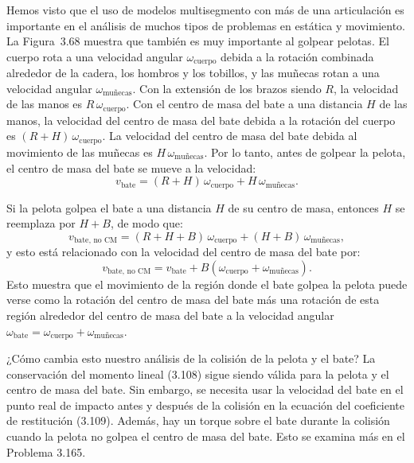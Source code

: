 \documentclass[12pt]{book}
\begin{document}
Hemos visto que el uso de modelos multisegmento con más de una articulación es importante en el análisis de muchos tipos de problemas en estática y movimiento. La Figura~3.68 muestra que también es muy importante al golpear pelotas. El cuerpo rota a una velocidad angular $\omega_{\text{cuerpo}}$ debida a la rotación combinada alrededor de la cadera, los hombros y los tobillos, y las muñecas rotan a una velocidad angular $\omega_{\text{muñecas}}$. Con la extensión de los brazos siendo $R$, la velocidad de las manos es $R\,\omega_{\text{cuerpo}}$. Con el centro de masa del bate a una distancia $H$ de las manos, la velocidad del centro de masa del bate debida a la rotación del cuerpo es $(R + H)\,\omega_{\text{cuerpo}}$. La velocidad del centro de masa del bate debida al movimiento de las muñecas es $H\,\omega_{\text{muñecas}}$. Por lo tanto, antes de golpear la pelota, el centro de masa del bate se mueve a la velocidad:
\begin{equation}
v_{\text{bate}} = (R + H)\,\omega_{\text{cuerpo}} + H\,\omega_{\text{muñecas}}.
\label{eq:3.131}
\end{equation}

Si la pelota golpea el bate a una distancia $H$ de su centro de masa, entonces $H$ se reemplaza por $H + B$, de modo que:
\begin{equation}
v_{\text{bate, no CM}} = (R + H + B)\,\omega_{\text{cuerpo}} + (H + B)\,\omega_{\text{muñecas}},
\label{eq:3.132}
\end{equation}
y esto está relacionado con la velocidad del centro de masa del bate por:
\begin{equation}
v_{\text{bate, no CM}} = v_{\text{bate}} + B(\omega_{\text{cuerpo}} + \omega_{\text{muñecas}}).
\label{eq:3.133}
\end{equation}
Esto muestra que el movimiento de la región donde el bate golpea la pelota puede verse como la rotación del centro de masa del bate más una rotación de esta región alrededor del centro de masa del bate a la velocidad angular $\omega_{\text{bate}} = \omega_{\text{cuerpo}} + \omega_{\text{muñecas}}$.

¿Cómo cambia esto nuestro análisis de la colisión de la pelota y el bate? La conservación del momento lineal (3.108) sigue siendo válida para la pelota y el centro de masa del bate. Sin embargo, se necesita usar la velocidad del bate en el punto real de impacto antes y después de la colisión en la ecuación del coeficiente de restitución (3.109). Además, hay un torque sobre el bate durante la colisión cuando la pelota no golpea el centro de masa del bate. Esto se examina más en el Problema 3.165.
\end{document}
